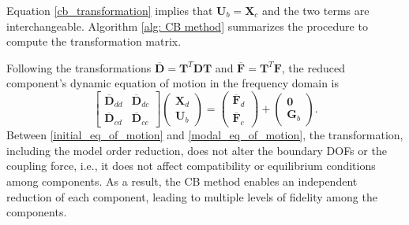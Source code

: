 Equation \eqref{cb_transformation} implies that $\mathbf{U}_{b}=\mathbf{X}_{c}$ and the two terms are interchangeable.
Algorithm \ref{alg: CB method} summarizes the procedure to compute the transformation matrix.

{Following the transformations $\overline{\mathbf{D}} = \mathbf{T}^{T}\mathbf{D}\mathbf{T}$ and $\overline{\mathbf{F}} = \mathbf{T}^{T}\mathbf{F}$, the reduced component's dynamic equation of motion in the frequency domain is}%
\begin{equation}
    \begin{bmatrix}
        \overline{\mathbf{D}}_{dd} & \overline{\mathbf{D}}_{dc} \\
        \overline{\mathbf{D}}_{cd} & \overline{\mathbf{D}}_{cc}
    \end{bmatrix}
    \begin{pmatrix}
        \mathbf{X}_{d} \\
        \mathbf{U}_{b}
    \end{pmatrix}
    =
    \begin{pmatrix}
        \overline{\mathbf{F}}_{d} \\
        \overline{\mathbf{F}}_{c}
    \end{pmatrix}
    +
    \begin{pmatrix}
        \mathbf{0} \\
        \mathbf{G}_{b}
    \end{pmatrix}.
    \label{modal_eq_of_motion}
\end{equation}
Between \eqref{initial_eq_of_motion} and \eqref{modal_eq_of_motion}, the transformation, including the model order reduction, does not alter the boundary DOFs or the coupling force, i.e., it does not affect compatibility or equilibrium conditions among components.
As a result, the CB method enables an independent reduction of each component, leading to multiple levels of fidelity among the components.
